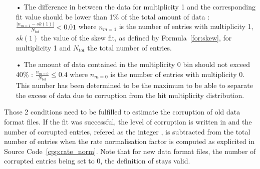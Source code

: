 	\begin{itemize}
		\item[•] The difference in between the data for multiplicity 1 and the corresponding fit value should be lower than 1\% of the total amount of data : $\frac{\vert n_{m=1} - sk(1)\vert}{N_{tot}} < 0.01$ where $n_{m=1}$ is the number of entries with multiplicity 1, $sk(1)$ the value of the skew fit, as defined by Formula~\ref{for:skew}, for multiplicity 1 and $N_{tot}$ the total number of entries.
		\item[•] The amount of data contained in the multiplicity 0 bin should not exceed 40\% : $\frac{n_{m=0}}{N_{tot}} \leq 0.4$ where $n_{m=0}$ is the number of entries with multiplicity 0. This number has been determined to be the maximum to be able to separate the excess of data due to corruption from the hit multiplicity distribution.
	\end{itemize}
	
	Those 2 conditions need to be fulfilled to estimate the corruption of old data format files. If the fit was successful, the  level of corruption is written in  and the number of corrupted entries, refered as the integer , is subtracted from the total number of entries when the rate normalisation factor is computed as explicited in Source Code~\ref{cpp:rate_norm}. Note that for new data format files, the number of corrupted entries being set to 0, the definition of  stays valid.\\
	
